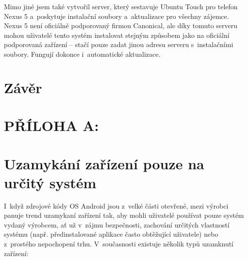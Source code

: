 \documentclass[12pt, a4paper, oneside]{article}
\begin{document}
Mimo jiné jsem také vytvořil server\cite{tasemnice-si-mail}, který sestavuje Ubuntu Touch pro telefon Nexus 5 a~poskytuje instalační soubory a~aktualizace pro všechny zájemce.  Nexus 5 není oficiálně podporovaný firmou Canonical, ale díky tomuto serveru mohou uživatelé tento systém instalovat stejným způsobem jako na oficiální podporovaná zařízení -- stačí pouze zadat jinou adresu serveru s~instalačními soubory. Fungují dokonce i~automatické aktualizace.

\newpage
\section*{Závěr}



\newpage
\section*{PŘÍLOHA A:}
\section*{Uzamykání zařízení pouze na určitý systém}
\label{sec:locked}
I~když zdrojové kódy OS Android jsou z~velké části otevřené, mezi výrobci panuje trend uzamykaní zařízení tak, aby mohli uživatelé používat pouze systém vydaný výrobcem, ať už v~zájmu bezpečnosti, zachování určitých vlastností systému (např. předinstalované aplikace často obtěžující uživatele) nebo z~prostého nepochopení trhu. V~současnosti existuje několik typů uzamknutí zařízení:
\end{document}
